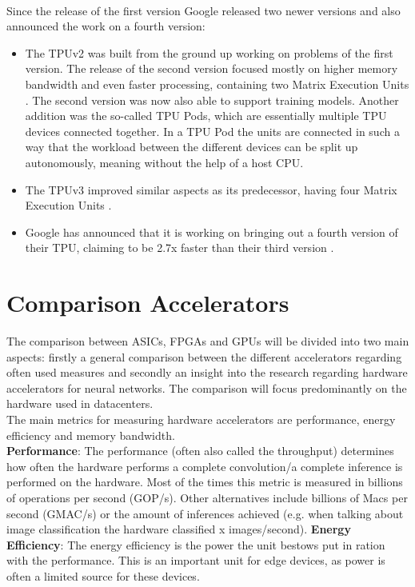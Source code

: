 \documentclass[conference]{IEEEtran}
\begin{document}
	\\
	Since the release of the first version Google released two newer versions and also announced the work on a fourth version:
	\begin{itemize}
		\item The TPUv2 was built from the ground up working on problems of the first version. The release of the second version focused mostly on higher memory bandwidth and even faster processing, containing two Matrix Execution Units \cite{secondversiontpu}. The second version was now also able to support training models. Another addition was the so-called TPU Pods, which are essentially multiple TPU devices connected together. In a TPU Pod the units are connected in such a way that the workload between the different devices can be split up autonomously, meaning without the help of a host CPU.
		\item The TPUv3 improved similar aspects as its predecessor, having four Matrix Execution Units \cite{thirdversiontpu}.
		\item  Google has announced that it is working on bringing out a fourth version of their TPU, claiming to be 2.7x faster than their third version \cite{fourthversiontpu}.
	\end{itemize}
	
	
	\section{Comparison Accelerators}
	The comparison between ASICs, FPGAs and GPUs will be divided into two main aspects: firstly a general comparison between the different accelerators regarding often used measures and secondly an insight into the research regarding hardware accelerators for neural networks. The comparison will focus predominantly on the hardware used in datacenters.
	\\
	The main metrics for measuring hardware accelerators are performance, energy efficiency and memory bandwidth.
	\\
	
	\textbf{Performance}:
	The performance (often also called the throughput) determines how often the hardware performs a complete convolution/a complete inference is performed on the hardware. Most of the times this metric is measured in billions of operations per second (GOP/s). Other alternatives include billions of Macs per second (GMAC/s) or the amount of inferences achieved (e.g. when talking about image classification the hardware classified x images/second). 
	\textbf{Energy Efficiency}:
	The energy efficiency is the power the unit bestows put in ration with the performance. This is an important unit for edge devices, as power is often a limited source for these devices.
	
\end{document}
